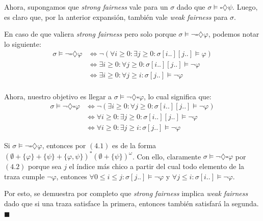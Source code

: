 \documentclass{article}
\begin{document}
Ahora, supongamos que \textit{strong fairness} vale para un $\sigma$ dado que $\sigma \vDash \square\diamondsuit\psi$.
Luego, es claro que, por la anterior expansión, también vale \textit{weak fairness} para $\sigma$.

En caso de que valiera \textit{strong fairness} pero solo porque $\sigma \vDash \neg\square\diamondsuit\varphi$, podemos notar lo siguiente:
\begin{equation}
	\tag*{(4.1)}
	\begin{aligned}
		\sigma \vDash \neg\square\diamondsuit\varphi & \iff \neg(\forall i \geq 0 : \exists j \geq 0 : \sigma[i..][j..] \vDash \varphi) \\
		                                             & \iff \exists i \geq 0 : \forall j \geq 0 : \sigma[i..][j..] \vDash \neg\varphi   \\
		                                             & \iff \exists i \geq 0 : \forall j \geq i : \sigma[j..] \vDash \neg\varphi        \\
	\end{aligned}
\end{equation}

Ahora, nuestro objetivo es llegar a $\sigma \vDash \neg\diamondsuit\square\varphi$, lo cual significa que:
\begin{equation}
	\tag*{(4.2)}
	\begin{aligned}
		\sigma \vDash \neg\diamondsuit\square\varphi & \iff \neg(\exists i \geq 0 : \forall j \geq 0 : \sigma[i..][j..] \vDash \neg\varphi) \\
		                                             & \iff \forall i \geq 0 : \exists j \geq 0 : \sigma[i..][j..] \vDash \neg\varphi       \\
		                                             & \iff \forall i \geq 0 : \exists j \geq i : \sigma[j..] \vDash \neg\varphi
	\end{aligned}
\end{equation}

Si $\sigma \vDash \neg\square\diamondsuit\varphi$, entonces por $(4.1)$ es de la forma $(\emptyset + \{\varphi\} + \{\psi\} + \{\varphi, \psi\})^*(\emptyset + \{\psi\})^\omega$.
Con ello, claramente $\sigma \vDash \neg\diamondsuit\square\varphi$ por $(4.2)$ porque sea $j$ el índice más chico a partir del cual todo elemento de la traza cumple $\neg\varphi$, entonces $\forall 0 \leq i \leq j : \sigma[j..] \vDash \neg\varphi$ y $\forall j \leq i : \sigma[i..] \vDash \neg\varphi$.

Por esto, se demuestra por completo que \textit{strong fairness} implica \textit{weak fairness} dado que si una traza satisface la primera, entonces también satisfará la segunda. $\blacksquare$
\end{document}
